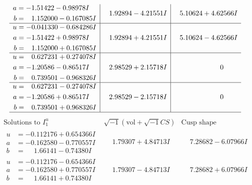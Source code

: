 \documentclass[1p]{elsarticle_modified}
\theoremstyle{definition}
\newcommand{\I}{\sqrt{-1}}
\begin{document}
$$\begin{array}{c|c|c}
\begin{aligned}
a &= -1.51422 - 0.98978 I \\
b &= \phantom{-}1.152000 - 0.167085 I\end{aligned}
 & \phantom{-}1.92894 - 4.21551 I & \phantom{-}5.10624 + 4.62566 I \\ \hline\begin{aligned}
u &= -0.041330 - 0.684286 I \\
a &= -1.51422 + 0.98978 I \\
b &= \phantom{-}1.152000 + 0.167085 I\end{aligned}
 & \phantom{-}1.92894 + 4.21551 I & \phantom{-}5.10624 - 4.62566 I \\ \hline\begin{aligned}
u &= \phantom{-}0.627231 + 0.274078 I \\
a &= -1.20586 - 0.86517 I \\
b &= \phantom{-}0.739501 - 0.968326 I\end{aligned}
 & \phantom{-}2.98529 + 2.15718 I & \phantom{-0.000000 } 0 \\ \hline\begin{aligned}
u &= \phantom{-}0.627231 - 0.274078 I \\
a &= -1.20586 + 0.86517 I \\
b &= \phantom{-}0.739501 + 0.968326 I\end{aligned}
 & \phantom{-}2.98529 - 2.15718 I & \phantom{-0.000000 } 0\\
 \hline 
 \end{array}$$\newpage$$\begin{array}{c|c|c}  
\text{Solutions to }I^u_{1}& \I (\text{vol} + \sqrt{-1}CS) & \text{Cusp shape}\\
 \hline 
\begin{aligned}
u &= -0.112176 + 0.654366 I \\
a &= -0.162580 - 0.770557 I \\
b &= \phantom{-}1.66141 - 0.74380 I\end{aligned}
 & \phantom{-}1.79307 + 4.84713 I & \phantom{-}7.28682 - 6.07966 I \\ \hline\begin{aligned}
u &= -0.112176 - 0.654366 I \\
a &= -0.162580 + 0.770557 I \\
b &= \phantom{-}1.66141 + 0.74380 I\end{aligned}
 & \phantom{-}1.79307 - 4.84713 I & \phantom{-}7.28682 + 6.07966 I \\ \hline\begin{aligned}

\end{aligned}
\end{array}$$
\end{document}
